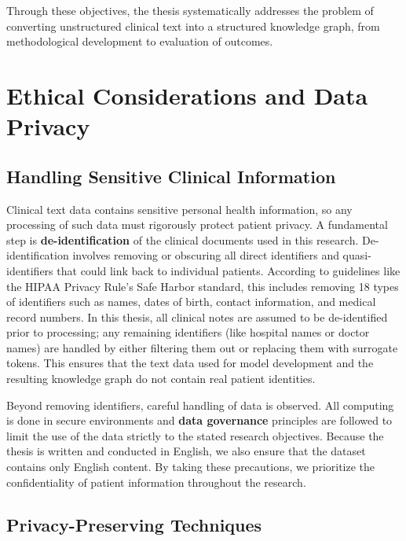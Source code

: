Through these objectives, the thesis systematically addresses the problem of converting unstructured clinical text into a structured knowledge graph, from methodological development to evaluation of outcomes.


\section{Ethical Considerations and Data Privacy}

\subsection{Handling Sensitive Clinical Information}

Clinical text data contains sensitive personal health information, so any processing of such data must rigorously protect patient privacy. A fundamental step is \textbf{de-identification} of the clinical documents used in this research. De-identification involves removing or obscuring all direct identifiers and quasi-identifiers that could link back to individual patients. According to guidelines like the HIPAA Privacy Rule's Safe Harbor standard, this includes removing 18 types of identifiers such as names, dates of birth, contact information, and medical record numbers. In this thesis, all clinical notes are assumed to be de-identified prior to processing; any remaining identifiers (like hospital names or doctor names) are handled by either filtering them out or replacing them with surrogate tokens. This ensures that the text data used for model development and the resulting knowledge graph do not contain real patient identities.

Beyond removing identifiers, careful handling of data is observed. All computing is done in secure environments and \textbf{data governance} principles are followed to limit the use of the data strictly to the stated research objectives. Because the thesis is written and conducted in English, we also ensure that the dataset contains only English content. By taking these precautions, we prioritize the confidentiality of patient information throughout the research.

\subsection{Privacy-Preserving Techniques}

